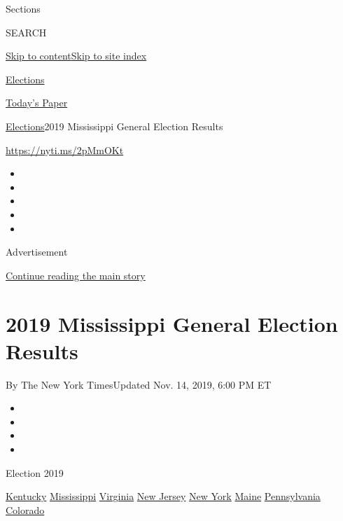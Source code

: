 Sections

SEARCH

\protect\hyperlink{site-content}{Skip to
content}\protect\hyperlink{site-index}{Skip to site index}

\href{https://www.nytimes3xbfgragh.onion/news-event/2020-election}{Elections}

\href{https://myaccount.nytimes3xbfgragh.onion/auth/login?response_type=cookie\&client_id=vi}{}

\href{https://www.nytimes3xbfgragh.onion/section/todayspaper}{Today's
Paper}

\href{/news-event/2020-election}{Elections}\textbar{}2019 Mississippi
General Election Results

\url{https://nyti.ms/2pMmOKt}

\begin{itemize}
\item
\item
\item
\item
\item
\end{itemize}

Advertisement

\protect\hyperlink{after-top}{Continue reading the main story}

\hypertarget{2019-mississippi-general-election-results}{%
\section{2019 Mississippi General Election
Results}\label{2019-mississippi-general-election-results}}

By The New York TimesUpdated Nov. 14, 2019, 6:00 PM ET

\begin{itemize}
\item
\item
\item
\item
\end{itemize}

Election 2019

\href{https://www.nytimes3xbfgragh.onion/interactive/2019/11/05/us/elections/results-kentucky-general-elections.html}{Kentucky}
\href{https://www.nytimes3xbfgragh.onion/interactive/2019/11/05/us/elections/results-mississippi-general-elections.html}{Mississippi}
\href{https://www.nytimes3xbfgragh.onion/interactive/2019/11/05/us/elections/results-virginia-general-elections.html}{Virginia}
\href{https://www.nytimes3xbfgragh.onion/interactive/2019/11/05/us/elections/results-new-jersey-general-elections.html}{New
Jersey}
\href{https://www.nytimes3xbfgragh.onion/interactive/2019/11/05/us/elections/results-new-york-general-elections.html}{New
York}
\href{https://www.nytimes3xbfgragh.onion/interactive/2019/11/05/us/elections/results-maine-general-elections.html}{Maine}
\href{https://www.nytimes3xbfgragh.onion/interactive/2019/11/05/us/elections/results-pennsylvania-general-elections.html}{Pennsylvania}
\href{https://www.nytimes3xbfgragh.onion/interactive/2019/11/05/us/elections/results-colorado-general-elections.html}{Colorado}

